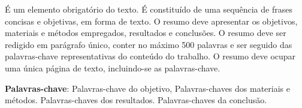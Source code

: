 
\noindent%
É um elemento obrigatório do texto. É constituído de uma sequência de frases concisas e objetivas, em forma de texto.
O resumo deve apresentar os objetivos, materiais e métodos empregados, resultados e conclusões. 
O resumo deve ser redigido em parágrafo único, conter no máximo 500 palavras e ser seguido das palavras-chave  representativas do conteúdo do trabalho. O resumo deve ocupar uma única página de texto, incluindo-se as palavras-chave.
\vfill

\noindent 
\textbf{Palavras-chave}: Palavras-chave do objetivo, Palavras-chaves dos materiais e métodos. Palavras-chaves dos resultados. Palavras-chaves da conclusão.
